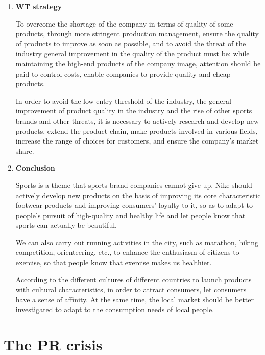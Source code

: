 \documentclass[a4paper, 12pt]{report}
\begin{document}
\begin{enumerate}
    \item \textbf{WT strategy} \par To overcome the shortage of the company in terms of quality of some products, through more stringent production management, ensure the quality of products to improve as soon as possible, and to avoid the threat of the industry general improvement in the quality of the product must be: while maintaining the high-end products of the company image, attention should be paid to control costs, enable companies to provide quality and cheap products.\par
    In order to avoid the low entry threshold of the industry, the general improvement of product quality in the industry and the rise of other sports brands and other threats, it is necessary to actively research and develop new products, extend the product chain, make products involved in various fields, increase the range of choices for customers, and ensure the company's market share.
    \item \textbf{Conclusion} \par Sports is a theme that sports brand companies cannot give up. Nike should actively develop new products on the basis of improving its core characteristic footwear products and improving consumers' loyalty to it, so as to adapt to people's pursuit of high-quality and healthy life and let people know that sports can actually be beautiful.\par
    We can also carry out running activities in the city, such as marathon, hiking competition, orienteering, etc., to enhance the enthusiasm of citizens to exercise, so that people know that exercise makes us healthier.\par
    According to the different cultures of different countries to launch products with cultural characteristics, in order to attract consumers, let consumers have a sense of affinity. At the same time, the local market should be better investigated to adapt to the consumption needs of local people.
\end{enumerate}
\section{The PR crisis}
\end{document}
